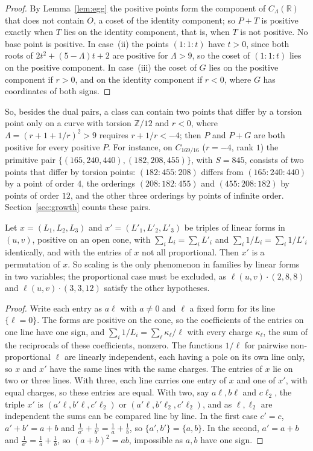 \documentclass[10pt]{article}
\newcommand{\R}{\mathbb{R}}
\newcommand{\Z}{\mathbb{Z}}
\begin{document}
\begin{proof}
By Lemma~\ref{lem:egg} the positive points form the component of $C_\Lambda(\R)$ that does not contain $O$, a coset of the identity component; so $P+T$ is positive exactly when $T$ lies on the identity component, that is, when $T$ is not positive. No base point is positive. In case~(ii) the points $(1:1:t)$ have $t>0$, since both roots of $2t^2+(5-\Lambda)t+2$ are positive for $\Lambda>9$, so the coset of $(1:1:t)$ lies on the positive component. In case~(iii) the coset of $G$ lies on the positive component if $r>0$, and on the identity component if $r<0$, where $G$ has coordinates of both signs.
\end{proof}

So, besides the dual pairs, a class can contain two points that differ by a torsion point only on a curve with torsion $\Z/12$ and $r<0$, where $\Lambda=(r+1+1/r)^2>9$ requires $r+1/r<-4$; then $P$ and $P+G$ are both positive for every positive $P$. For instance, on $C_{169/16}$ ($r=-4$, rank $1$) the primitive pair $\{(165,240,440),(182,208,455)\}$, with $S=845$, consists of two points that differ by torsion points: $(182:455:208)$ differs from $(165:240:440)$ by a point of order $4$, the orderings $(208:182:455)$ and $(455:208:182)$ by points of order $12$, and the other three orderings by points of infinite order. Section~\ref{sec:growth} counts these pairs.

\begin{remark}\label{rem:nolinear}
Let $x=(L_1,L_2,L_3)$ and $x'=(L'_1,L'_2,L'_3)$ be triples of linear forms in $(u,v)$, positive on an open cone, with $\sum_iL_i=\sum_iL'_i$ and $\sum_i1/L_i=\sum_i1/L'_i$ identically, and with the entries of $x$ not all proportional. Then $x'$ is a permutation of $x$. So scaling is the only phenomenon in families by linear forms in two variables; the proportional case must be excluded, as $\ell(u,v)\cdot(2,8,8)$ and $\ell(u,v)\cdot(3,3,12)$ satisfy the other hypotheses.
\end{remark}

\begin{proof}
Write each entry as $a\ell$ with $a\ne0$ and $\ell$ a fixed form for its line $\{\ell=0\}$. The forms are positive on the cone, so the coefficients of the entries on one line have one sign, and $\sum_i1/L_i=\sum_\ell\kappa_\ell/\ell$ with every charge $\kappa_\ell$, the sum of the reciprocals of these coefficients, nonzero. The functions $1/\ell$ for pairwise non-proportional $\ell$ are linearly independent, each having a pole on its own line only, so $x$ and $x'$ have the same lines with the same charges. The entries of $x$ lie on two or three lines. With three, each line carries one entry of $x$ and one of $x'$, with equal charges, so these entries are equal. With two, say $a\ell,b\ell$ and $c\ell_2$, the triple $x'$ is $(a'\ell,b'\ell,c'\ell_2)$ or $(a'\ell,b'\ell_2,c'\ell_2)$, and as $\ell,\ell_2$ are independent the sums can be compared line by line. In the first case $c'=c$, $a'+b'=a+b$ and $\frac1{a'}+\frac1{b'}=\frac1a+\frac1b$, so $\{a',b'\}=\{a,b\}$. In the second, $a'=a+b$ and $\frac1{a'}=\frac1a+\frac1b$, so $(a+b)^2=ab$, impossible as $a,b$ have one sign.
\end{proof}
\end{document}
